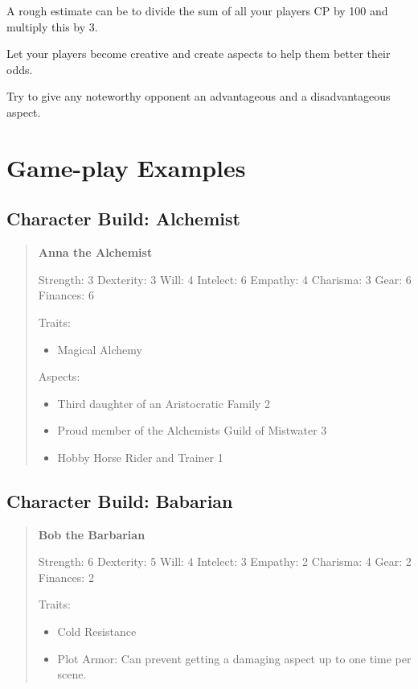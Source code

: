 \documentclass[11pt]{article}
\begin{document}
{A rough estimate can be to divide the sum of all your players CP by 100 and multiply this by 3.

Let your players become creative and create aspects to help them better their odds.

Try to give any noteworthy opponent an advantageous and a disadvantageous aspect.

\section{Game-play Examples}
\label{sec:orgccbec9b}
\subsection{Character Build: Alchemist}
\label{sec:org85d62ed}

\begin{quote}
\textbf{Anna the Alchemist}

Strength: 3
Dexterity: 3
Will: 4
Intelect: 6
Empathy: 4
Charisma: 3
Gear: 6
Finances: 6

Traits:
\begin{itemize}
\item Magical Alchemy
\end{itemize}

Aspects:
\begin{itemize}
\item Third daughter of an Aristocratic Family 2
\item Proud member of the Alchemists Guild of Mistwater 3
\item Hobby Horse Rider and Trainer 1
\end{itemize}
\end{quote}

\subsection{Character Build: Babarian}
\label{sec:org9d189fe}

\begin{quote}
\textbf{Bob the Barbarian}

Strength: 6
Dexterity: 5
Will: 4
Intelect: 3
Empathy: 2
Charisma: 4
Gear: 2
Finances: 2

Traits:
\begin{itemize}
\item Cold Resistance
\item Plot Armor: Can prevent getting a damaging aspect up to one time per scene.
\end{itemize}


\end{quote}}
\end{document}
